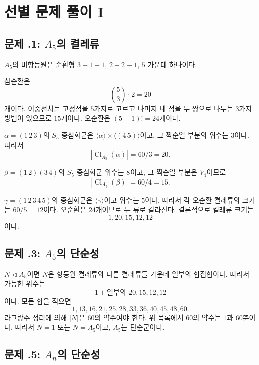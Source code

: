 \clearpage
\section{선별 문제 풀이 I}
\label{sec:abel-ruffini-solutions-a}

\subsection*{문제 \thechapter.1: $A_5$의 켤레류}

\begin{solution}
$A_5$의 비항등원은 순환형 $3+1+1$, $2+2+1$, $5$ 가운데 하나이다.

삼순환은
\[
  \binom53\cdot2=20
\]
개이다. 이중전치는 고정점을 $5$가지로 고르고 나머지 네 점을 두 쌍으로 나누는 $3$가지 방법이 있으므로 $15$개이다. 오순환은 $(5-1)!=24$개이다.

$\alpha=(1\,2\,3)$의 $S_5$-중심화군은 $\langle\alpha\rangle\times\langle(4\,5)\rangle$이고, 그 짝순열 부분의 위수는 $3$이다. 따라서
\[
  |\operatorname{Cl}_{A_5}(\alpha)|=60/3=20.
\]

$\beta=(1\,2)(3\,4)$의 $S_5$-중심화군 위수는 $8$이고, 그 짝순열 부분은 $V_4$이므로
\[
  |\operatorname{Cl}_{A_5}(\beta)|=60/4=15.
\]

$\gamma=(1\,2\,3\,4\,5)$의 중심화군은 $\langle\gamma\rangle$이고 위수는 $5$이다. 따라서 각 오순환 켤레류의 크기는 $60/5=12$이다. 오순환은 $24$개이므로 두 류로 갈라진다. 결론적으로 켤레류 크기는
\[
  \boxed{1,20,15,12,12}
\]
이다.
\end{solution}

\subsection*{문제 \thechapter.3: $A_5$의 단순성}

\begin{solution}
$N\triangleleft A_5$이면 $N$은 항등원 켤레류와 다른 켤레류들 가운데 일부의 합집합이다. 따라서 가능한 위수는
\[
  1+\text{일부의 }20,15,12,12
\]
이다. 모든 합을 적으면
\[
  1,13,16,21,25,28,33,36,40,45,48,60.
\]
라그랑주 정리에 의해 $|N|$은 $60$의 약수여야 한다. 위 목록에서 $60$의 약수는 $1$과 $60$뿐이다. 따라서 $N=1$ 또는 $N=A_5$이고, $A_5$는 단순군이다.
\end{solution}

\subsection*{문제 \thechapter.5: $A_n$의 단순성}

